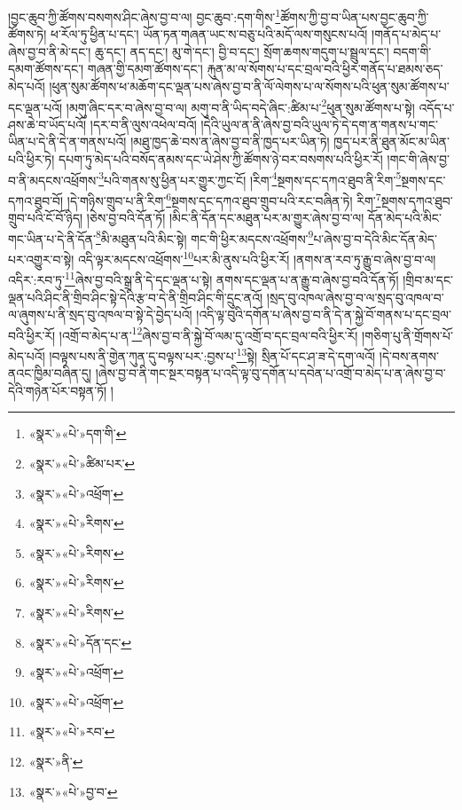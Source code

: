 །བྱང་ཆུབ་ཀྱི་ཚོགས་བསགས་ཤིང་ཞེས་བྱ་བ་ལ། བྱང་ཆུབ་:དག་གིས་\footnote{«སྣར་»«པེ་»དག་གི་}ཚོགས་ཀྱི་བྱ་བ་ཡིན་པས་བྱང་ཆུབ་ཀྱི་ཚོགས་ཏེ། ཕ་རོལ་ཏུ་ཕྱིན་པ་དང་། ཡོན་ཏན་གཞན་ཡང་ས་བཅུ་པའི་མདོ་ལས་གསུངས་པའོ། །གནོད་པ་མེད་པ་ཞེས་བྱ་བ་ནི་མེ་དང་། ཆུ་དང་། ནད་དང་། མུ་གེ་དང་། བྱི་བ་དང་། སྲོག་ཆགས་གདུག་པ་སྦྲུལ་དང་། བདག་གི་དམག་ཚོགས་དང་། གཞན་གྱི་དམག་ཚོགས་དང་། རྐུན་མ་ལ་སོགས་པ་དང་བྲལ་བའི་ཕྱིར་གནོད་པ་ཐམས་ཅད་མེད་པའོ། །ཕུན་སུམ་ཚོགས་ཕ་མཆོག་དང་ལྡན་པས་ཞེས་བྱ་བ་ནི་ལོ་ལེགས་པ་ལ་སོགས་པའི་ཕུན་སུམ་ཚོགས་པ་དང་ལྡན་པའོ། །མགུ་ཞིང་དར་བ་ཞེས་བྱ་བ་ལ། མགུ་བ་ནི་ཡིད་བདེ་ཞིང་:ཚིམ་པ་\footnote{«སྣར་»«པེ་»ཚིམ་པར་}ཕུན་སུམ་ཚོགས་པ་སྟེ། འདོད་པ་ཤས་ཆེ་བ་ཡོད་པའོ། །དར་བ་ནི་ལུས་འཕེལ་བའོ། །དེའི་ཡུལ་ན་ནི་ཞེས་བྱ་བའི་ཡུལ་ཏེ་དེ་དག་ན་གནས་པ་གང་ཡིན་པ་དེ་ནི་དེ་ན་གནས་པའོ། །མཐུ་ཁྱད་ཆེ་བས་ན་ཞེས་བྱ་བ་ནི་ཁྱད་པར་ཡིན་ཏེ། ཁྱད་པར་ནི་ཐུན་མོང་མ་ཡིན་པའི་ཕྱིར་ཏེ། དཔག་ཏུ་མེད་པའི་བསོད་ནམས་དང་ཡེ་ཤེས་ཀྱི་ཚོགས་ཉེ་བར་བསགས་པའི་ཕྱིར་རོ། །གང་གི་ཞེས་བྱ་བ་ནི་མདངས་འཕྲོགས་\footnote{«སྣར་»«པེ་»འཕྲོག་}པའི་གནས་སུ་ཕྱིན་པར་གྱུར་ཀྱང་ངོ། །རིག་\footnote{«སྣར་»«པེ་»རིགས་}སྔགས་དང་དཀའ་ཐུབ་ནི་རིག་\footnote{«སྣར་»«པེ་»རིགས་}སྔགས་དང་དཀའ་ཐུབ་བོ། །དེ་གཉིས་གྲུབ་པ་ནི་རིག་\footnote{«སྣར་»«པེ་»རིགས་}སྔགས་དང་དཀའ་ཐུབ་གྲུབ་པའི་རང་བཞིན་ཏེ། རིག་\footnote{«སྣར་»«པེ་»རིགས་}སྔགས་དཀའ་ཐུབ་གྲུབ་པའི་ངོ་བོ་ཉིད། །ཅེས་བྱ་བའི་དོན་ཏོ། །མིང་ནི་དོན་དང་མཐུན་པར་མ་གྱུར་ཞེས་བྱ་བ་ལ། དོན་མེད་པའི་མིང་གང་ཡིན་པ་དེ་ནི་དོན་\footnote{«སྣར་»«པེ་»དོན་དང་}མི་མཐུན་པའི་མིང་སྟེ། གང་གི་ཕྱིར་མདངས་འཕྲོགས་\footnote{«སྣར་»«པེ་»འཕྲོག་}པ་ཞེས་བྱ་བ་དེའི་མིང་དོན་མེད་པར་འགྱུར་བ་སྟེ། འདི་ལྟར་མདངས་འཕྲོགས་\footnote{«སྣར་»«པེ་»འཕྲོག་}པར་མི་ནུས་པའི་ཕྱིར་རོ། །ནགས་ན་རབ་ཏུ་རྒྱུ་བ་ཞེས་བྱ་བ་ལ། འདིར་:རབ་ཏུ་\footnote{«སྣར་»«པེ་»རབ་}ཞེས་བྱ་བའི་སྒྲ་ནི་དེ་དང་ལྡན་པ་སྟེ། ནགས་དང་ལྡན་པ་ན་རྒྱུ་བ་ཞེས་བྱ་བའི་དོན་ཏོ། །གྲིབ་མ་དང་ལྡན་པའི་ཤིང་ནི་གྲིབ་ཤིང་སྟེ་དེའི་རྩ་བ་དེ་ནི་གྲིབ་ཤིང་གི་དྲུང་ནའོ། །སྲད་བུ་འཁལ་ཞེས་བྱ་བ་ལ་སྲད་བུ་འཁལ་བ་ལ་ཞུགས་པ་ནི་སྲད་བུ་འཁལ་བ་སྟེ་དེ་བྱེད་པའོ། །འདི་ལྟ་བུའི་དགོན་པ་ཞེས་བྱ་བ་ནི་དེ་ན་སྐྱེ་བོ་གནས་པ་དང་བྲལ་བའི་ཕྱིར་རོ། །འགྲོ་བ་མེད་པ་ན་\footnote{«སྣར་»ནི་}ཞེས་བྱ་བ་ནི་སྐྱེ་བོ་ལམ་དུ་འགྲོ་བ་དང་བྲལ་བའི་ཕྱིར་རོ། །གཅིག་པུ་ནི་གྲོགས་པོ་མེད་པའོ། །བལྟས་པས་ནི་གྱེན་ཀུན་དུ་བལྟས་པར་:བྱས་པ་\footnote{«སྣར་»«པེ་»བྱ་བ་}སྟེ། སྲིན་པོ་དང་ཤ་ཟ་དེ་དག་ལའོ། །དེ་བས་ནགས་ནའང་ཁྱིམ་བཞིན་དུ། །ཞེས་བྱ་བ་ནི་གང་སྔར་བསྟན་པ་འདི་ལྟ་བུ་དགོན་པ་དབེན་པ་འགྲོ་བ་མེད་པ་ན་ཞེས་བྱ་བ་དེའི་གཉེན་པོར་བསྟན་ཏོ། །
